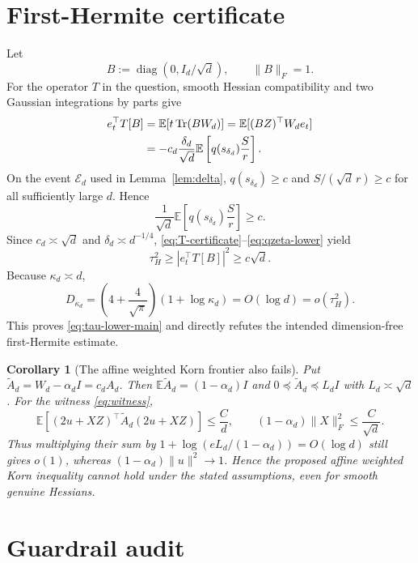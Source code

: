 \documentclass[11pt]{article}
\numberwithin{equation}{section}
\newtheorem{corollary}[theorem]{Corollary}
\DeclareMathOperator{\Tr}{Tr}
\DeclareMathOperator{\diag}{diag}
\newcommand{\E}{\mathbb E}
\begin{document}
\section{First-Hermite certificate}

Let
\begin{equation}\label{eq:Btest}
  B:=\diag(0,I_d/\sqrt d),
  \qquad
  \lVert B\rVert_F=1.
\end{equation}
For the operator $T$ in the question, smooth Hessian compatibility and two
Gaussian integrations by parts give
\begin{align}
  e_t^\top T[B]
  &=\E[t\Tr(BW_d)]
    =\E[(BZ)^\top W_de_t]\notag\\
  &=-c_d\frac{\delta_d}{\sqrt d}
    \E\left[q(s_{\delta_d})\frac{S}{r}\right].
  \label{eq:T-certificate}
\end{align}
On the event $\mathcal E_d$ used in Lemma~\ref{lem:delta},
$q(s_{\delta_d})\ge c$ and $S/(\sqrt d\,r)\ge c$ for all sufficiently
large $d$.  Hence
\begin{equation}\label{eq:qzeta-lower}
  \frac1{\sqrt d}\E\left[q(s_{\delta_d})\frac S r\right]\ge c.
\end{equation}
Since $c_d\asymp\sqrt d$ and $\delta_d\asymp d^{-1/4}$,
\eqref{eq:T-certificate}--\eqref{eq:qzeta-lower} yield
\begin{equation}\label{eq:tau-lower}
  \tau_H^2\ge|e_t^\top T[B]|^2\ge c\sqrt d.
\end{equation}
Because $\kappa_d\asymp d$,
\[
  D_{\kappa_d}
  =\left(4+\frac4{\sqrt\pi}\right)(1+\log\kappa_d)
  =O(\log d)
  =o(\tau_H^2).
\]
This proves \eqref{eq:tau-lower-main} and directly refutes the intended
dimension-free first-Hermite estimate.

\begin{corollary}[The affine weighted Korn frontier also fails]
Put $\widetilde A_d=W_d-\alpha_dI=c_dA_d$.  Then
$\E\widetilde A_d=(1-\alpha_d)I$ and
$0\preceq\widetilde A_d\preceq L_dI$ with $L_d\asymp\sqrt d$.  For the
witness \eqref{eq:witness},
\[
  \E[(2u+XZ)^\top\widetilde A_d(2u+XZ)]\le\frac Cd,
  \qquad
  (1-\alpha_d)\lVert X\rVert_F^2\le\frac C{\sqrt d}.
\]
Thus multiplying their sum by
$1+\log(eL_d/(1-\alpha_d))=O(\log d)$ still gives $o(1)$, whereas
$(1-\alpha_d)\lVert u\rVert^2\to1$.  Hence the proposed affine weighted Korn
inequality cannot hold under the stated assumptions, even for smooth genuine
Hessians.
\end{corollary}

\section{Guardrail audit}
\end{document}

